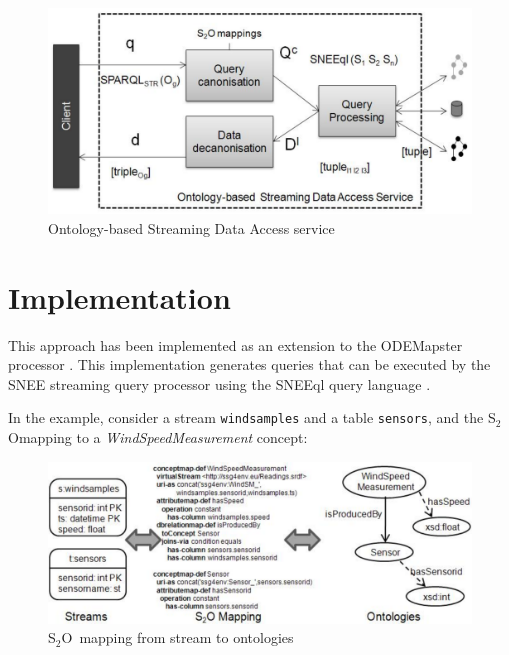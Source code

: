 \documentclass[runningheads,a4paper]{llncs}
\newcommand{\subscript}[1]{\ensuremath{_{\textrm{#1}}}}
\newcommand{\stwoo}{\textsf{S\subscript{2}O}}
\begin{document}
\begin{figure}[here]
\vspace{-20pt} \hspace{20pt}
\begin{center}
\includegraphics[width=8 cm]{img/approach}
\end{center}
\vspace{-10pt} \caption{Ontology-based Streaming Data Access service} \label{fig:SemanticIntegrator} \vspace{-20pt}
\end{figure}



\section{Implementation}
\label{execution}

This approach has been implemented as an extension to the
ODEMapster processor \cite{Barrasa_04}. This implementation generates queries that can be executed by the SNEE streaming query processor using the SNEEql query language \cite{Brenninkmeijer_08}.

In the example, consider a stream \texttt{windsamples} and a table \texttt{sensors}, and the \stwoo mapping to a \textit{WindSpeedMeasurement} concept:

\begin{figure}[here]
\vspace{-20pt} \hspace{20pt}
\includegraphics[width=12 cm]{img/mapping}
\vspace{-10pt} \caption{\stwoo\ mapping from stream to ontologies} \label{fig:Mappings} \vspace{-10pt}
\end{figure}
\end{document}
